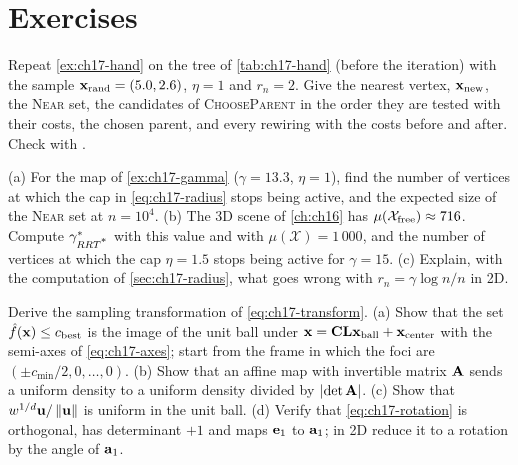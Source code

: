 \section{Exercises}
\label{sec:ch17-exercises}

\begin{exercise}[\difficulty{1}]
\label{exr:ch17-hand}
Repeat \cref{ex:ch17-hand} on the tree of \cref{tab:ch17-hand} (before the
iteration) with the sample $\mathbf{x}_{\mathrm{rand}}=(5.0,2.6)$, $\eta=1$ and
$r_n=2$. Give the nearest vertex, $\mathbf{x}_{\mathrm{new}}$, the \textsc{Near}
set, the candidates of \textsc{ChooseParent} in the order they are tested
with their costs, the chosen parent, and every rewiring with the costs
before and after. Check with .
\end{exercise}

\begin{exercise}[\difficulty{1}]
\label{exr:ch17-radius}
(a) For the map of \cref{ex:ch17-gamma} ($\gamma=13.3$, $\eta=1$), find the
number of vertices at which the cap in \cref{eq:ch17-radius} stops being
active, and the expected size of the \textsc{Near} set at $n=10^4$.
(b) The 3D scene of \cref{ch:ch16} has $\mu(\mathcal{X}_{\mathrm{free}})\approx716$. Compute
$\gamma^*_{RRT\textsuperscript{*}}$ with this value and with $\mu(\mathcal{X})=1\,000$,
and the number of vertices at which the cap $\eta=1.5$ stops being active
for $\gamma=15$. (c) Explain, with the computation of
\cref{sec:ch17-radius}, what goes wrong with $r_n=\gamma\log n/n$ in 2D.
\end{exercise}

\begin{exercise}[\difficulty{2}]
\label{exr:ch17-ellipsoid}
Derive the sampling transformation of \cref{eq:ch17-transform}. (a) Show
that the set $\hat f(\mathbf{x})\le c_{\mathrm{best}}$ is the image of the unit ball
under $\mathbf{x}=\mathbf{C}\mathbf{L}\mathbf{x}_{\mathrm{ball}}+\mathbf{x}_{\mathrm{center}}$
with the semi-axes of \cref{eq:ch17-axes}; start from the frame in which
the foci are $(\pm c_{\min}/2,0,\dots,0)$. (b) Show that an affine map with
invertible matrix $\mathbf{A}$ sends a uniform density to a uniform density
divided by $\left\lvert \det\mathbf{A} \right\rvert$. (c) Show that
$w^{1/d}\mathbf{u}/\left\lVert \mathbf{u} \right\rVert$ is uniform in the unit ball. (d) Verify
that \cref{eq:ch17-rotation} is orthogonal, has determinant $+1$ and maps
$\mathbf{e}_1$ to $\mathbf{a}_1$; in 2D reduce it to a rotation by the angle of
$\mathbf{a}_1$.
\end{exercise}

